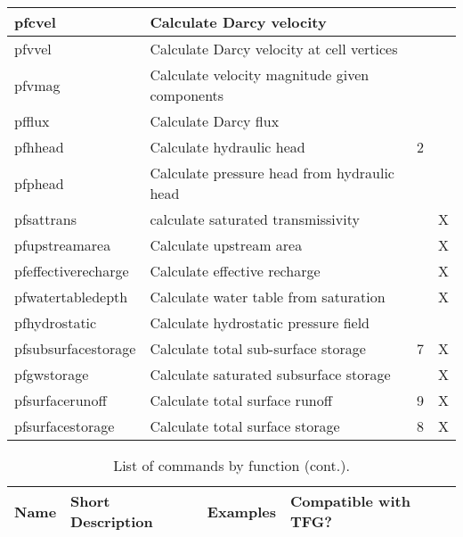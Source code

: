 {\begin{table}
\begin{tabular}{ | p{3cm} | p{6cm} | p{2cm} | p{3cm} | }
	pfcvel & Calculate Darcy velocity &  &  \\ \hline
	pfvvel & Calculate Darcy velocity at cell vertices &  &  \\ \hline
	pfvmag & Calculate velocity magnitude given components &  &  \\ \hline
	pfflux & Calculate Darcy flux &  &  \\ \hline
	pfhhead & Calculate hydraulic head & 2 &  \\ \hline
	pfphead & Calculate pressure head from hydraulic head &  &  \\ \hline
	pfsattrans & calculate saturated transmissivity &  & X \\ \hline
	pfupstreamarea & Calculate upstream area &  & X \\ \hline
	pfeffectiverecharge & Calculate effective recharge &  & X \\ \hline
	pfwatertabledepth & Calculate water table from saturation &  & X \\ \hline
	pfhydrostatic & Calculate hydrostatic pressure field  &  &  \\ \hline
	pfsubsurfacestorage & Calculate total sub-surface storage & 7 & X \\ \hline
	pfgwstorage & Calculate saturated subsurface storage &  & X \\ \hline
	pfsurfacerunoff & Calculate total surface runoff & 9 & X \\ \hline
	pfsurfacestorage & Calculate total surface storage & 8 &  X\\ \hline
\end{tabular}
\label{pftools1}
\end{table}

\begin{table} \center
\caption{List of \pftools{} commands by function (cont.).}

\begin{tabular}{ | p{3cm} | p{6cm} | p{2cm} | p{3cm} | }
\hline
	\bf{Name} & \bf{Short Description} & \bf{Examples} & \bf{Compatible with TFG?} \\ \hline


\end{tabular}
\end{table}}
